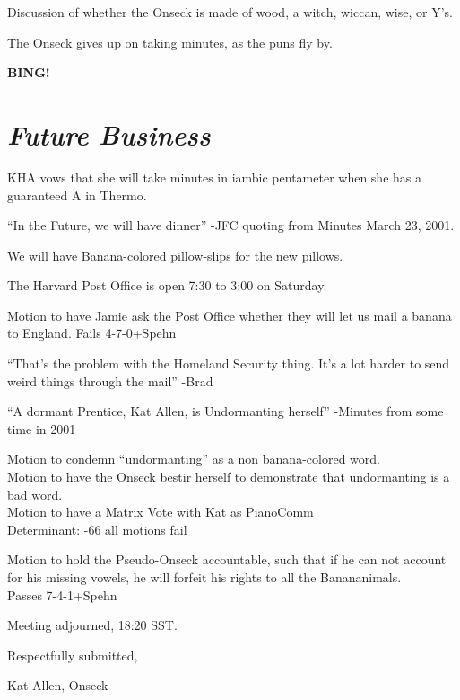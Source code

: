 \documentclass[10pt]{article}
\newcommand{\bing}{{\bf BING!} }
\newcommand{\goto}[1]{\bing \vskip 12pt \section*{{\em{#1}}}}
\begin{document}
Discussion of whether the Onseck is made of wood, a witch, wiccan,
wise, or Y's.

The Onseck gives up on taking minutes, as the puns fly by.

\goto{Future Business}
KHA vows that she will take minutes in iambic pentameter when she has
a guaranteed A in Thermo.

``In the Future, we will have dinner'' -JFC quoting from Minutes March
23, 2001.

We will have Banana-colored pillow-slips for the new pillows.

The Harvard Post Office is open 7:30 to 3:00 on Saturday.

Motion to have Jamie ask the Post Office whether they will let us mail
a banana to England.
Fails 4-7-0+Spehn

``That's the problem with the Homeland Security thing. It's a lot
harder to send weird things through the mail'' -Brad

``A dormant Prentice, Kat Allen, is Undormanting herself'' -Minutes
from some time in 2001

Motion to condemn ``undormanting'' as a non banana-colored word.\\
Motion to have the Onseck bestir herself to demonstrate that
undormanting is a bad word.\\
Motion to have a Matrix Vote with Kat as PianoComm\\
Determinant: -66 all motions fail

Motion to hold the Pseudo-Onseck accountable, such that if he can not
account for his missing vowels, he will forfeit his rights to all the Banananimals.\\
Passes 7-4-1+Spehn

\vspace{12pt}

\noindent
Meeting adjourned, 18:20 SST.

\vspace{18pt}

\centerline{Respectfully submitted,}
\centerline{Kat Allen,  Onseck}
\end{document}
